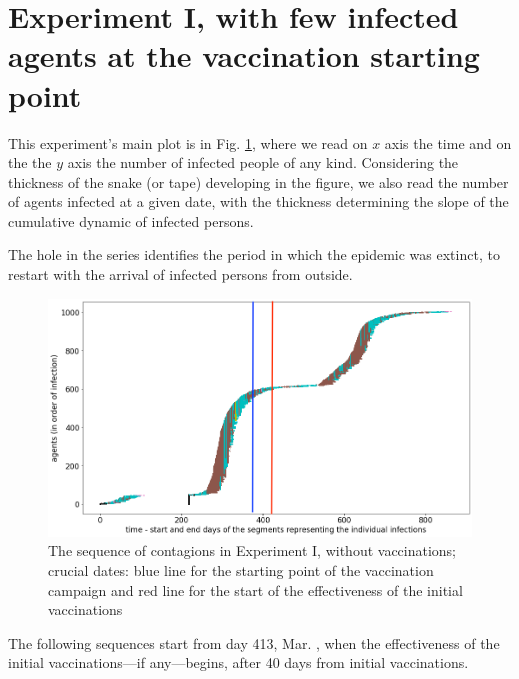 \documentclass[graybox]{svmult}
\begin{document}
\section{Experiment I, with few infected agents at the vaccination starting point}
\label{I}


This experiment's main plot is in Fig. \ref{ExperimentForGA_I_base}, where we read on $x$ axis the time and on the  the $y$ axis the number of infected people of any kind. Considering the thickness of the snake (or tape) developing in the figure, we also read the number of agents infected at a given date, with the thickness determining the slope of the cumulative dynamic of infected persons.

The hole in the series identifies the period in which the epidemic was extinct, to restart with the arrival of infected persons from outside.


\begin{figure}[t]
\center 
\includegraphics[scale=0.3]{ExperimentForGA_I_base.png}  
\caption{The sequence of contagions in Experiment I, without vaccinations; crucial dates: blue line for the starting point of the vaccination campaign and red line for the start of the effectiveness of the initial vaccinations} 
\label{ExperimentForGA_I_base}
\end{figure}

The following sequences start from day 413, Mar. , when the effectiveness of the initial vaccinations---if any---begins, after 40 days from initial vaccinations.


\end{document}
